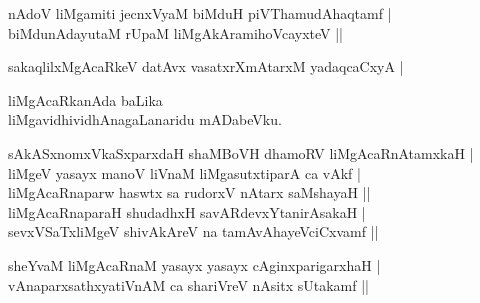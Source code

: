 \begin{entry}
\begin{shl}
nAdoV liMgamiti jecnxVyaM biMduH piVThamudAhaqtamf |\\
biMdunAdayutaM rUpaM liMgAkAramihoVcayxteV ||
\end{shl}
\end{entry}

\begin{entry}
\begin{shl}
sakaqlilxMgAcaRkeV datAvx vasatxrXmAtarxM yadaqcaCxyA |
\end{shl}

\begin{shl}
liMgAcaRkanAda baLika\\
liMgavidhividhAnagaLanaridu mADabeVku.
\end{shl}
\end{entry}

\begin{entry}
\begin{shl}
sAkASxnomxVkaSxparxdaH shaMBoVH dhamoRV liMgAcaRnAtamxkaH |\\
liMgeV yasayx manoV liVnaM liMgasutxtiparA ca vAkf |\\
liMgAcaRnaparw haswtx sa rudorxV nAtarx saMshayaH ||\\
liMgAcaRnaparaH shudadhxH savARdevxYtanirAsakaH |\\
sevxVSaTxliMgeV shivAkAreV na tamAvAhayeVciCxvamf ||
\end{shl}
\begin{shl}
sheYvaM liMgAcaRnaM yasayx yasayx cAginxparigarxhaH |\\
vAnaparxsathxyatiVnAM ca shariVreV nAsitx sUtakamf ||
\end{shl}

\gl{}
\end{entry}

\begin{entry}
\gl{}
\end{entry}

